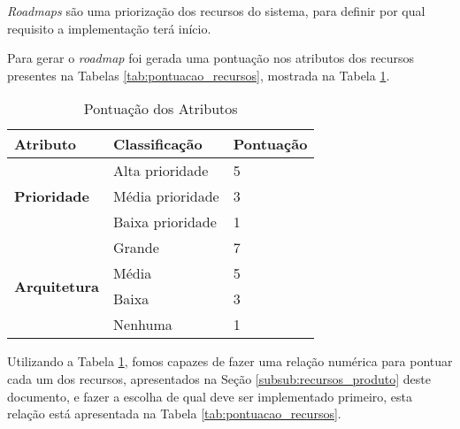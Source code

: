 
\textit{Roadmaps} são uma priorização dos recursos do sistema, para definir por qual requisito a implementação terá início.

Para gerar o \textit{roadmap} foi gerada uma pontuação nos atributos dos recursos presentes na Tabelas \ref{tab:pontuacao_recursos}, mostrada na Tabela \ref{tab:pontuacao_atributos}.

\begin{table}[H]
\centering
\begin{tabular}{|p{2cm}|p{5cm}|p{3cm}|}

\hline
\textbf{Atributo} &
\textbf{Classificação} &
\textbf{Pontuação}
\\ \hline

\multirow{3}{*}{
\textbf{Prioridade}} &
	Alta prioridade &
	5
	\\ \cline{2-3} &
	Média prioridade  &
	3
	\\ \cline{2-3} &
	Baixa prioridade  &
	1
	\\ \hline

\multirow{4}{*}{\textbf{Arquitetura}} &
	Grande &
	7
	\\ \cline{2-3} &
	Média &
	5
	\\ \cline{2-3} &
	Baixa &
	3
	\\ \cline{2-3} &
	Nenhuma &
	1
	\\ \hline
\end{tabular}
\caption{Pontuação dos Atributos}
\label{tab:pontuacao_atributos}
\end{table}

Utilizando a Tabela \ref{tab:pontuacao_atributos}, fomos capazes de fazer uma relação numérica para pontuar cada um dos recursos, apresentados na Seção \ref{subsub:recursos_produto} deste documento, e fazer a escolha de qual deve ser implementado primeiro, esta relação está apresentada na Tabela \ref{tab:pontuacao_recursos}.

